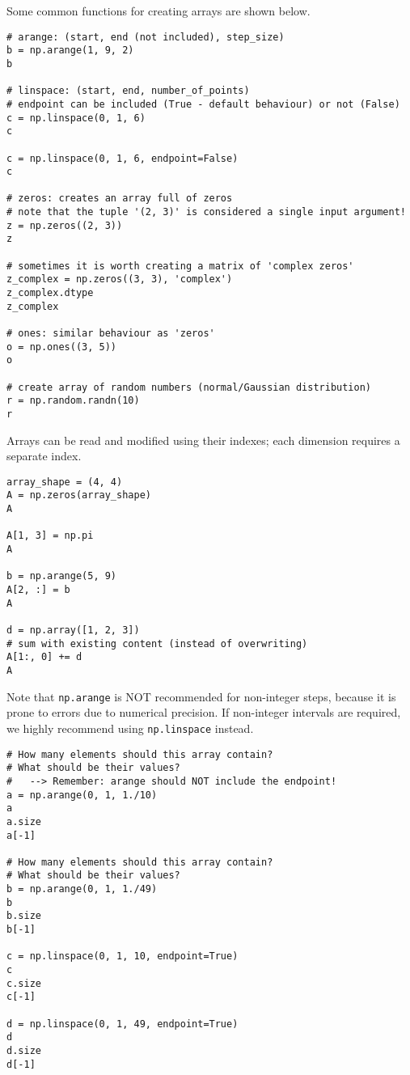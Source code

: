 Some common functions for creating arrays are shown below.

\begin{lstlisting}[frame=single]
# arange: (start, end (not included), step_size)
b = np.arange(1, 9, 2) 
b

# linspace: (start, end, number_of_points)
# endpoint can be included (True - default behaviour) or not (False)
c = np.linspace(0, 1, 6)
c

c = np.linspace(0, 1, 6, endpoint=False)
c

# zeros: creates an array full of zeros
# note that the tuple '(2, 3)' is considered a single input argument!
z = np.zeros((2, 3))
z

# sometimes it is worth creating a matrix of 'complex zeros'
z_complex = np.zeros((3, 3), 'complex')
z_complex.dtype
z_complex

# ones: similar behaviour as 'zeros'
o = np.ones((3, 5))
o

# create array of random numbers (normal/Gaussian distribution)
r = np.random.randn(10)
r
\end{lstlisting}

Arrays can be read and modified using their indexes; each dimension requires a separate index.

\begin{lstlisting}[frame=single]
array_shape = (4, 4)
A = np.zeros(array_shape)
A

A[1, 3] = np.pi
A

b = np.arange(5, 9)
A[2, :] = b
A

d = np.array([1, 2, 3])
# sum with existing content (instead of overwriting)
A[1:, 0] += d
A
\end{lstlisting}


Note that {\tt np.arange} is NOT recommended for non-integer steps, because it is prone to errors due to numerical precision. If non-integer intervals are required, we highly recommend using {\tt np.linspace} instead.

\begin{lstlisting}[frame=single]
# How many elements should this array contain?
# What should be their values?
#   --> Remember: arange should NOT include the endpoint!
a = np.arange(0, 1, 1./10)
a
a.size
a[-1]

# How many elements should this array contain?
# What should be their values?
b = np.arange(0, 1, 1./49)
b
b.size
b[-1]

c = np.linspace(0, 1, 10, endpoint=True)
c
c.size
c[-1]

d = np.linspace(0, 1, 49, endpoint=True)
d
d.size
d[-1]
\end{lstlisting}

